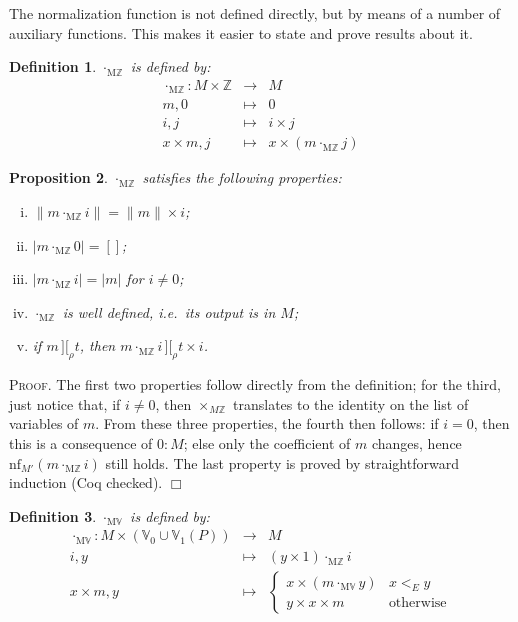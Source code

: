 \documentclass{article}
\newtheorem{definition}{Definition}[section]
\newtheorem{proposition}[definition]{Proposition}
\newenvironment{proof}{\smallskip\textsc{Proof.}}{\hspace*{\fill}$\Box$}
\newcommand{\intII}{\,]\![}
\newcommand{\intrel}{\mathbin{\intII_{\rho}}}
\newcommand{\Z}{{\mathbb Z}}
\newcommand{\V}{{\mathbb V}}
\newcommand{\nf}{\ensuremath{\mathrm{nf}}}
\newcommand{\multMZ}{\ensuremath{\cdot_{\mathrm M\Z}}}
\newcommand{\multMV}{\ensuremath{\cdot_{\mathrm M\V}}}
\begin{document}
The normalization function is not defined directly, but by means of a
number of auxiliary functions.  This makes it easier to state and prove
results about it.

\begin{definition}\label{defn:multMZ} {\multMZ} is defined by:
\begin{eqnarray*}
\multMZ : M \times \Z & \to & M \\
 m, 0 & \mapsto & 0 \\
 i, j & \mapsto & i\times j \\
 x\times m, j & \mapsto & x\times (m\multMZ j)
\end{eqnarray*}
\end{definition}

\begin{proposition}\label{multMZ}
{\multMZ} satisfies the following properties:
\begin{enumerate}[(i)]
\item $\|m\multMZ i\|=\|m\|\times i$;
\item $|m\multMZ 0|=[]$;
\item $|m\multMZ i|=|m|$ for $i\neq 0$;
\item {\multMZ} is well defined, i.e.\ its output is in $M$;
\item if $m\intrel t$, then $m\multMZ i\intrel t\times i$.
\end{enumerate}
\end{proposition}
\begin{proof}
The first two properties follow directly from the definition; for the third,
just notice that, if $i\neq 0$, then $\times_{M \Z}$ translates to the
identity on the list of variables of $m$.
From these three properties, the fourth then follows: if $i=0$, then this
is a consequence of $0:M$; else only the coefficient of $m$ changes, hence
$\nf_{M'}(m\multMZ i)$ still holds.
The last property is proved by straightforward induction (Coq checked).
\end{proof}

\begin{definition}\label{defn:multMV} {\multMV} is defined by:
\begin{eqnarray*}
\multMV : M \times (\V_0\cup\V_1(P)) & \to & M \\
 i, y & \mapsto & (y\times 1)\multMZ i \\
 x\times m, y & \mapsto & 
\left\{\begin{array}{ll}x\times(m\multMV y) & x<_E y \\
 y\times x\times m & \mbox{otherwise}\end{array}\right.
\end{eqnarray*}
\end{definition}
\end{document}
